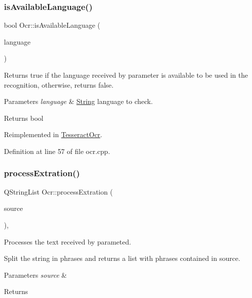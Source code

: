 \subsubsection{\texorpdfstring{is\+Available\+Language()}{isAvailableLanguage()}}
{\footnotesize\ttfamily bool Ocr\+::is\+Available\+Language (\begin{DoxyParamCaption}\item[{const Q\+String \&}]{language }\end{DoxyParamCaption})\hspace{0.3cm}{\ttfamily [virtual]}}



Returns true if the language received by parameter is available to be used in the recognition, otherwise, returns false. 


\begin{DoxyParams}{Parameters}
{\em language} & \mbox{\hyperlink{classString}{String}} language to check. \\
\hline
\end{DoxyParams}
\begin{DoxyReturn}{Returns}
bool 
\end{DoxyReturn}


Reimplemented in \mbox{\hyperlink{classTesseractOcr_aefe201ace3b144cb8834931b57f79bfd}{Tesseract\+Ocr}}.



Definition at line 57 of file ocr.\+cpp.

\mbox{\label{classOcr_ac6f28693948e68e8958f1a27c73c79d1}} 
\subsubsection{\texorpdfstring{process\+Extration()}{processExtration()}}
{\footnotesize\ttfamily Q\+String\+List Ocr\+::process\+Extration (\begin{DoxyParamCaption}\item[{const Q\+String \&}]{source }\end{DoxyParamCaption})\hspace{0.3cm}{\ttfamily [protected]}, {}}



Processes the text received by parameted. 

Split the string in phrases and returns a list with phrases contained in source. 
\begin{DoxyParams}{Parameters}
{\em source} & \\
\hline
\end{DoxyParams}
\begin{DoxyReturn}{Returns}

\end{DoxyReturn}



